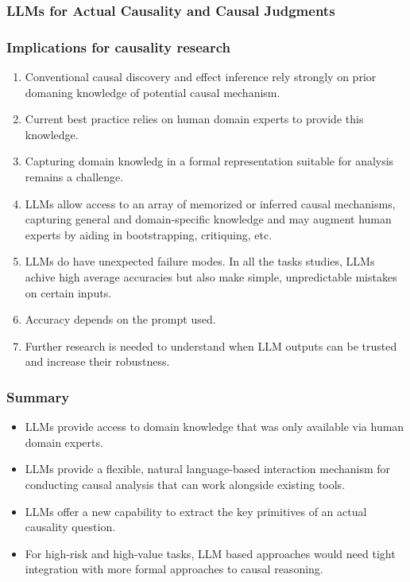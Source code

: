 \documentclass{beamer}
\begin{document}
\begin{frame}
	\frametitle{LLMs for Actual Causality and Causal Judgments}
	\begin{itemize}
		
	\end{itemize}
\end{frame}

\begin{frame}
	\frametitle{Implications for causality research}
	\begin{enumerate}
		\item Conventional causal discovery and effect inference rely strongly on prior domaning knowledge of potential causal mechanism. 
		\item Current best practice relies on human domain experts to provide this knowledge.
		\item Capturing domain knowledg in a formal representation suitable for analysis remains a challenge.
		\item LLMs allow access to an array of memorized or inferred causal mechanisms, capturing general and domain-specific knowledge and may augment human experts by aiding in bootstrapping, critiquing, etc.
		\item LLMs do have unexpected failure modes. In all the tasks studies, LLMs achive high average accuracies but also make simple, unpredictable mistakes on certain inputs.
		\item Accuracy depends on the prompt used.
		\item Further research is needed to understand when LLM outputs can be trusted and increase their robustness.
	\end{enumerate}
\end{frame}

\begin{frame}
	\frametitle{Summary}
	\begin{itemize}
		\item LLMs provide access to domain knowledge that was only available
			via human domain experts.
		\item LLMs provide a flexible, natural language-based interaction 
			mechanism for conducting causal analysis that can work
			alongside existing tools.
		\item LLMs offer a new capability to extract the key primitives of
			an actual causality question.
		\item For high-risk and high-value tasks, LLM based approaches would
			need tight integration with more formal approaches to
			causal reasoning.
	\end{itemize}
\end{frame}
\end{document}
